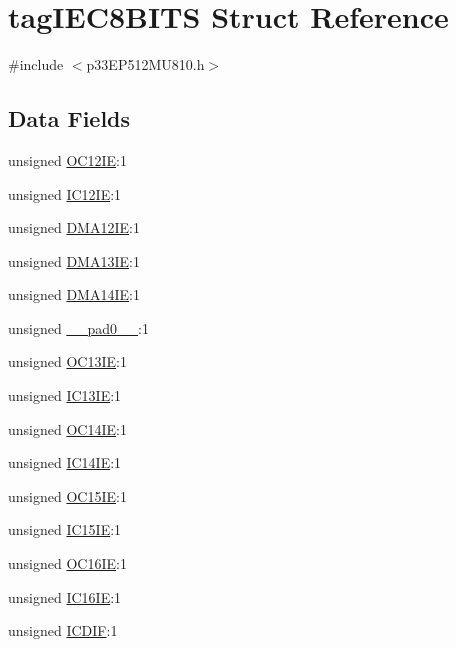 \hypertarget{structtag_i_e_c8_b_i_t_s}{}\section{tag\+I\+E\+C8\+B\+I\+TS Struct Reference}
\label{structtag_i_e_c8_b_i_t_s}


{\ttfamily \#include $<$p33\+E\+P512\+M\+U810.\+h$>$}

\subsection*{Data Fields}
\begin{DoxyCompactItemize}
\item 
unsigned \hyperlink{structtag_i_e_c8_b_i_t_s_ad718b23302d525e8676c14de4b0da81a}{O\+C12\+IE}\+:1
\item 
unsigned \hyperlink{structtag_i_e_c8_b_i_t_s_a40fb5f315af761588f5d9a082dcac059}{I\+C12\+IE}\+:1
\item 
unsigned \hyperlink{structtag_i_e_c8_b_i_t_s_ad1118ef215d6ce2b92708b9e27ac046e}{D\+M\+A12\+IE}\+:1
\item 
unsigned \hyperlink{structtag_i_e_c8_b_i_t_s_a9a6053e0ff75bb4816703858ee0f7179}{D\+M\+A13\+IE}\+:1
\item 
unsigned \hyperlink{structtag_i_e_c8_b_i_t_s_a64328147ee186ba104e5158a27e81d9c}{D\+M\+A14\+IE}\+:1
\item 
unsigned \hyperlink{structtag_i_e_c8_b_i_t_s_adf71f3d8410c1f1dbbc96680a92c49af}{\+\_\+\+\_\+pad0\+\_\+\+\_\+}\+:1
\item 
unsigned \hyperlink{structtag_i_e_c8_b_i_t_s_aa7734c9e1750aece72510f3ed949313a}{O\+C13\+IE}\+:1
\item 
unsigned \hyperlink{structtag_i_e_c8_b_i_t_s_a494a0e6052f6455bfed222561a80e701}{I\+C13\+IE}\+:1
\item 
unsigned \hyperlink{structtag_i_e_c8_b_i_t_s_a98a733353937e64f60f624c58bbb3792}{O\+C14\+IE}\+:1
\item 
unsigned \hyperlink{structtag_i_e_c8_b_i_t_s_a326d00c9fa1b832fe43fb4697983dd46}{I\+C14\+IE}\+:1
\item 
unsigned \hyperlink{structtag_i_e_c8_b_i_t_s_ad6f8c604305e351ecc8192394a678c37}{O\+C15\+IE}\+:1
\item 
unsigned \hyperlink{structtag_i_e_c8_b_i_t_s_a8616a52431f00fa541edc5fe158309dd}{I\+C15\+IE}\+:1
\item 
unsigned \hyperlink{structtag_i_e_c8_b_i_t_s_af4184a5bd4a99c4516b2c1f3682709ab}{O\+C16\+IE}\+:1
\item 
unsigned \hyperlink{structtag_i_e_c8_b_i_t_s_a03d69c73074315a4dd4ba5f3cd2c73a1}{I\+C16\+IE}\+:1
\item 
unsigned \hyperlink{structtag_i_e_c8_b_i_t_s_a501faaccdfbb399fbbf215070c715b39}{I\+C\+D\+IF}\+:1
\end{DoxyCompactItemize}


